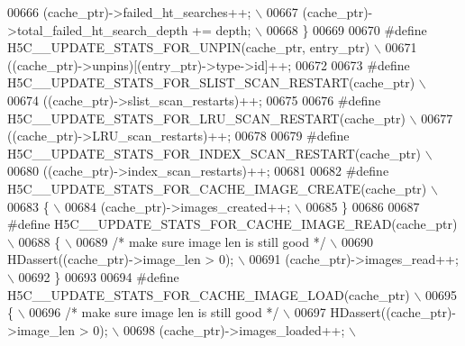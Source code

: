 \begin{DoxyCode}
00666 \textcolor{preprocessor}{        (cache\_ptr)->failed\_ht\_searches++;                      \(\backslash\)}
00667 \textcolor{preprocessor}{        (cache\_ptr)->total\_failed\_ht\_search\_depth += depth;     \(\backslash\)}
00668 \textcolor{preprocessor}{    \}}
00669 
00670 \textcolor{preprocessor}{#define H5C\_\_UPDATE\_STATS\_FOR\_UNPIN(cache\_ptr, entry\_ptr) \(\backslash\)}
00671 \textcolor{preprocessor}{    ((cache\_ptr)->unpins)[(entry\_ptr)->type->id]++;}
00672 
00673 \textcolor{preprocessor}{#define H5C\_\_UPDATE\_STATS\_FOR\_SLIST\_SCAN\_RESTART(cache\_ptr) \(\backslash\)}
00674 \textcolor{preprocessor}{    ((cache\_ptr)->slist\_scan\_restarts)++;}
00675 
00676 \textcolor{preprocessor}{#define H5C\_\_UPDATE\_STATS\_FOR\_LRU\_SCAN\_RESTART(cache\_ptr) \(\backslash\)}
00677 \textcolor{preprocessor}{    ((cache\_ptr)->LRU\_scan\_restarts)++;}
00678 
00679 \textcolor{preprocessor}{#define H5C\_\_UPDATE\_STATS\_FOR\_INDEX\_SCAN\_RESTART(cache\_ptr) \(\backslash\)}
00680 \textcolor{preprocessor}{    ((cache\_ptr)->index\_scan\_restarts)++;}
00681 
00682 \textcolor{preprocessor}{#define H5C\_\_UPDATE\_STATS\_FOR\_CACHE\_IMAGE\_CREATE(cache\_ptr) \(\backslash\)}
00683 \textcolor{preprocessor}{\{                                                           \(\backslash\)}
00684 \textcolor{preprocessor}{    (cache\_ptr)->images\_created++;                          \(\backslash\)}
00685 \textcolor{preprocessor}{\}}
00686 
00687 \textcolor{preprocessor}{#define H5C\_\_UPDATE\_STATS\_FOR\_CACHE\_IMAGE\_READ(cache\_ptr)  \(\backslash\)}
00688 \textcolor{preprocessor}{\{                                                          \(\backslash\)}
00689 \textcolor{preprocessor}{    }\textcolor{comment}{/* make sure image len is still good */}\textcolor{preprocessor}{                \(\backslash\)}
00690 \textcolor{preprocessor}{    HDassert((cache\_ptr)->image\_len > 0);                  \(\backslash\)}
00691 \textcolor{preprocessor}{    (cache\_ptr)->images\_read++;                            \(\backslash\)}
00692 \textcolor{preprocessor}{\}}
00693 
00694 \textcolor{preprocessor}{#define H5C\_\_UPDATE\_STATS\_FOR\_CACHE\_IMAGE\_LOAD(cache\_ptr)  \(\backslash\)}
00695 \textcolor{preprocessor}{\{                                                          \(\backslash\)}
00696 \textcolor{preprocessor}{    }\textcolor{comment}{/* make sure image len is still good */}\textcolor{preprocessor}{                \(\backslash\)}
00697 \textcolor{preprocessor}{    HDassert((cache\_ptr)->image\_len > 0);                  \(\backslash\)}
00698 \textcolor{preprocessor}{    (cache\_ptr)->images\_loaded++;                          \(\backslash\)}

\end{DoxyCode}
